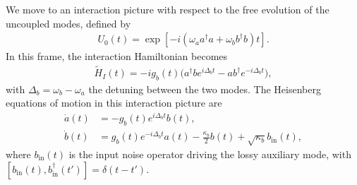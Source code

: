 \documentclass[prl,twocolumn,floatfix,10pt,superscriptaddress]{revtex4-2}
\begin{document}
We move to an interaction picture with respect to the free evolution of the uncoupled modes, defined by
\begin{align}
U_0(t) = \exp[-i(\omega_a a^\dagger a + \omega_b b^\dagger b)t].
\end{align}
In this frame, the interaction Hamiltonian becomes
\begin{align}
\tilde{H}_I(t) = -i g_b(t) \big(a^\dagger b e^{i \Delta_b t} - a b^\dagger e^{-i \Delta_b t}\big),
\end{align}
with $\Delta_b = \omega_b - \omega_a$ the detuning between the two modes. The Heisenberg equations of motion in this interaction picture are
\begin{align}
\dot{a}(t) &= -g_b(t) e^{i \Delta_b t} b(t), \\
\dot{b}(t) &=  g_b(t) e^{-i \Delta_b t} a(t) - \frac{\kappa_b}{2} b(t) +\sqrt{\kappa_b} b_{\text{in}}(t),
\end{align}
where $b_{\text{in}}(t)$ is the input noise operator driving the lossy auxiliary mode, with
$[b_{\text{in}}(t), b_{\text{in}}^\dagger(t')] = \delta(t - t')$.
\end{document}
